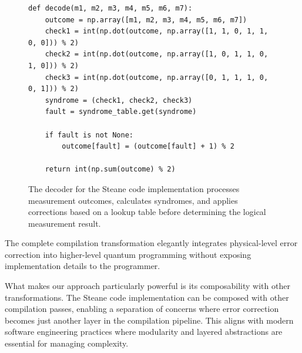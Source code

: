 \begin{figure}[t]
\begin{verbatim}
def decode(m1, m2, m3, m4, m5, m6, m7):
    outcome = np.array([m1, m2, m3, m4, m5, m6, m7])
    check1 = int(np.dot(outcome, np.array([1, 1, 0, 1, 1, 0, 0])) % 2)
    check2 = int(np.dot(outcome, np.array([1, 0, 1, 1, 0, 1, 0])) % 2)
    check3 = int(np.dot(outcome, np.array([0, 1, 1, 1, 0, 0, 1])) % 2)
    syndrome = (check1, check2, check3)
    fault = syndrome_table.get(syndrome)

    if fault is not None:
        outcome[fault] = (outcome[fault] + 1) % 2

    return int(np.sum(outcome) % 2)
\end{verbatim}
\caption{The decoder for the Steane code implementation processes measurement outcomes, calculates syndromes, and applies corrections based on a lookup table before determining the logical measurement result.}
\label{fig:steane-code-decode}
\end{figure}

The complete compilation transformation elegantly integrates physical-level error correction into higher-level quantum programming without exposing implementation details to the programmer.

What makes our approach particularly powerful is its composability with other transformations. The Steane code implementation can be composed with other compilation passes, enabling a separation of concerns where error correction becomes just another layer in the compilation pipeline. This aligns with modern software engineering practices where modularity and layered abstractions are essential for managing complexity.
